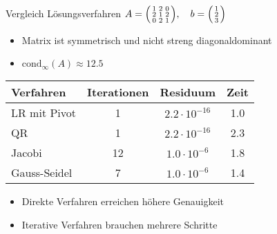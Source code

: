 \begin{KR}{Vergleich Lösungsverfahren}
$A = \begin{psmallmatrix}
1 & 2 & 0\\
2 & 1 & 2\\
0 & 2 & 1
\end{psmallmatrix}, \quad b = \begin{psmallmatrix}
1\\
2\\
3
\end{psmallmatrix}$

\small
\begin{itemize}
    \item Matrix ist symmetrisch und nicht streng diagonaldominant
    \item $\text{cond}_\infty(A) \approx 12.5$
\end{itemize}
\begin{center}
\begin{tabular}{l|ccc}
Verfahren & Iterationen & Residuum & Zeit\\
\hline
LR mit Pivot & 1 & $2.2\cdot10^{-16}$ & 1.0\\
QR & 1 & $2.2\cdot10^{-16}$ & 2.3\\
Jacobi & 12 & $1.0\cdot10^{-6}$ & 1.8\\
Gauss-Seidel & 7 & $1.0\cdot10^{-6}$ & 1.4\\
\end{tabular}
\end{center}
\vspace{-2mm}
\begin{itemize}
    \item Direkte Verfahren erreichen höhere Genauigkeit
    \item Iterative Verfahren brauchen mehrere Schritte
\end{itemize}
\end{KR}

